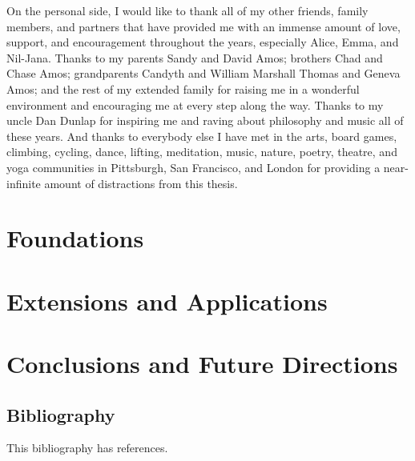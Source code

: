 \documentclass[12pt]{cmuthesis}
\begin{document}
\begin{acknowledgments}
  On the personal side, I would like to thank all of my
  other friends, family members, and partners that
  have provided me with an immense amount of love,
  support, and encouragement throughout the years,
  especially Alice, Emma, and Nil-Jana.
  Thanks to my parents Sandy and David Amos;
  brothers Chad and Chase Amos;
  grandparents Candyth and William Marshall Thomas
  and Geneva Amos; and the rest of my extended family
  for raising me in a wonderful environment and
  encouraging me at every step along the way.
  Thanks to my uncle Dan Dunlap for inspiring me and
  raving about philosophy and music all of these years.
  And thanks to everybody else I have met in the
  arts,
  board games,
  climbing,
  cycling,
  dance,
  lifting,
  meditation,
  music,
  nature,
  poetry,
  theatre, and
  yoga
  communities in Pittsburgh, San Francisco, and London for
  providing a near-infinite amount of distractions from
  this thesis.
\end{acknowledgments}

\pagestyle{plain}

\tableofcontents
\listoffigures
\listoftables
\listofalgorithms

\mainmatter




\part{Foundations}



\part{Extensions and Applications}




\part{Conclusions and Future Directions}


\chapter*{Bibliography}

\vspace{-25mm}
This bibliography has  references.
\vspace{10mm}

\printbibliography[heading=none]
\end{document}
